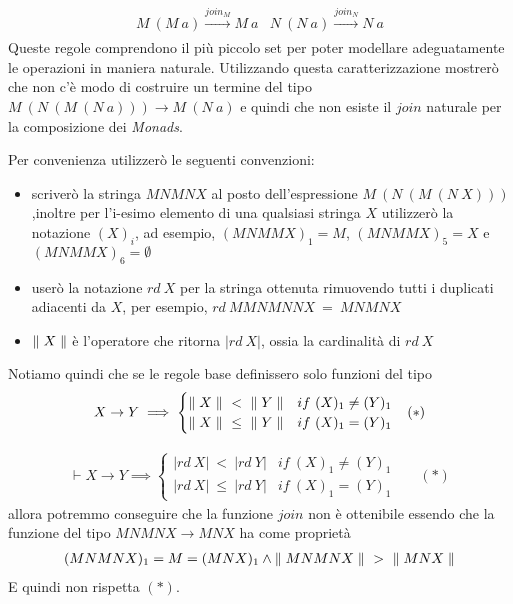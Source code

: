 \begin{align*}
  \begin{split}
    M\ (M\ a) \overset{join_M}{\longrightarrow} M\ a
  \end{split}
  \begin{split}
    N\ (N\ a) \overset{join_N}{\longrightarrow} N\ a
  \end{split}
\end{align*}
Queste regole comprendono il più piccolo set per poter modellare adeguatamente
le operazioni in maniera naturale.
Utilizzando questa caratterizzazione mostrerò che non c'è modo di costruire un
termine del tipo $M\ (N\ (M\ (N\ a))) \to M\ (N\ a)$ e quindi che non esiste il
$join$ naturale per la composizione dei \textit{Monads}.\newline

Per convenienza utilizzerò le seguenti convenzioni:
\begin{itemize}
  \item scriverò la stringa $MNMNX$ al posto dell'espressione $M\ (N\ (M\ (N\ X)))$
        ,inoltre per l'i-esimo elemento di una qualsiasi stringa $X$ utilizzerò
        la notazione $(X)_i$, ad esempio, $(MNMMX)_1 = M$, $(MNMMX)_5 = X$ e $(MNMMX)_6 = \emptyset$
  \item userò la notazione $rd\ X$ per la stringa ottenuta rimuovendo tutti i
        duplicati adiacenti da $X$, per esempio, $rd\ MMNMNNX\ =\ MNMNX$
  \item ${\parallel X\parallel}$ è l'operatore che ritorna $|rd\ X|$, ossia la cardinalità di $rd\ X$

\end{itemize}
Notiamo quindi che se le regole base definissero solo funzioni del tipo
\begin{align*}
  X \to Y \implies
  \begin{cases}
   {\parallel X\parallel}\ <\ {\parallel Y\parallel} &if\ (X)_1 \neq (Y)_1\\
   {\parallel X\parallel}\ \leq\ {\parallel Y\parallel} &if\ (X)_1 = (Y)_1
  \end{cases}
  && (*)
\end{align*}

\begin{align*}
  \vdash X \to Y \implies
  \begin{cases}
   |rd\ X|\ <\ |rd\ Y| &if\ (X)_1 \neq (Y)_1\\
   |rd\ X|\ \leq\ |rd\ Y| &if\ (X)_1 = (Y)_1
  \end{cases}
  && (*)
\end{align*}
allora potremmo conseguire che la funzione $join$ non è ottenibile essendo che
la funzione del tipo $MNMNX \to MNX$ ha come proprietà
\begin{align*}
  (MNMNX)_1 = M = (MNX)_1 \land
  {\parallel MNMNX\parallel}\ >\ {\parallel MNX\parallel}
\end{align*}
E quindi non rispetta $(*)$.\newline

